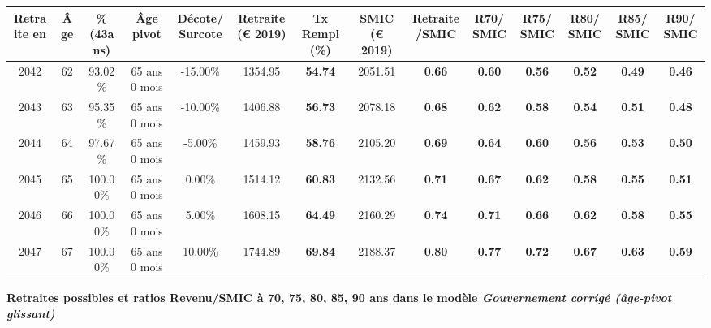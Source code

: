\begin{adjustbox}{max width=\textwidth} 
\begin{tabular}[htb]{|c|c||c|c|c||c|c||c|c||c|c|c|c|c|} 
\hline 
 Retraite en &  Âge &  \%(43ans) &  Âge pivot &  Décote/Surcote &  Retraite (\euro{} 2019) &  Tx Rempl(\%) &  SMIC (\euro{} 2019) &  Retraite/SMIC &  R70/SMIC &  R75/SMIC &  R80/SMIC &  R85/SMIC &  R90/SMIC \\ 
\hline \hline 
 2042 &  62 &  93.02\% &  65 ans 0 mois &  -15.00\% &  1354.95 &  {\bf 54.74} &  2051.51 &  {\bf {\color{red} 0.66}} &  {\bf {\color{red} 0.60}} &  {\bf {\color{red} 0.56}} &  {\bf {\color{red} 0.52}} &  {\bf {\color{red} 0.49}} &  {\bf {\color{red} 0.46}} \\ 
\hline 
 2043 &  63 &  95.35\% &  65 ans 0 mois &  -10.00\% &  1406.88 &  {\bf 56.73} &  2078.18 &  {\bf {\color{red} 0.68}} &  {\bf {\color{red} 0.62}} &  {\bf {\color{red} 0.58}} &  {\bf {\color{red} 0.54}} &  {\bf {\color{red} 0.51}} &  {\bf {\color{red} 0.48}} \\ 
\hline 
 2044 &  64 &  97.67\% &  65 ans 0 mois &  -5.00\% &  1459.93 &  {\bf 58.76} &  2105.20 &  {\bf {\color{red} 0.69}} &  {\bf {\color{red} 0.64}} &  {\bf {\color{red} 0.60}} &  {\bf {\color{red} 0.56}} &  {\bf {\color{red} 0.53}} &  {\bf {\color{red} 0.50}} \\ 
\hline 
 2045 &  65 &  100.00\% &  65 ans 0 mois &  0.00\% &  1514.12 &  {\bf 60.83} &  2132.56 &  {\bf {\color{red} 0.71}} &  {\bf {\color{red} 0.67}} &  {\bf {\color{red} 0.62}} &  {\bf {\color{red} 0.58}} &  {\bf {\color{red} 0.55}} &  {\bf {\color{red} 0.51}} \\ 
\hline 
 2046 &  66 &  100.00\% &  65 ans 0 mois &  5.00\% &  1608.15 &  {\bf 64.49} &  2160.29 &  {\bf {\color{red} 0.74}} &  {\bf {\color{red} 0.71}} &  {\bf {\color{red} 0.66}} &  {\bf {\color{red} 0.62}} &  {\bf {\color{red} 0.58}} &  {\bf {\color{red} 0.55}} \\ 
\hline 
 2047 &  67 &  100.00\% &  65 ans 0 mois &  10.00\% &  1744.89 &  {\bf 69.84} &  2188.37 &  {\bf {\color{red} 0.80}} &  {\bf {\color{red} 0.77}} &  {\bf {\color{red} 0.72}} &  {\bf {\color{red} 0.67}} &  {\bf {\color{red} 0.63}} &  {\bf {\color{red} 0.59}} \\ 
\hline 
\hline 
\end{tabular} 
\end{adjustbox} 
 
 \vspace{0.1cm} 
{\bf \noindent Retraites possibles et ratios Revenu/SMIC à 70, 75, 80, 85, 90 ans dans le modèle \emph{Gouvernement corrigé (âge-pivot glissant)}}  
 
